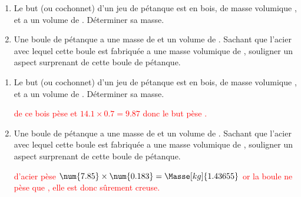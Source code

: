 \begin{exercice*}
    \begin{enumerate}
        \item Le but (ou cochonnet) d'un jeu de pétanque est en bois, de masse volumique , et a un volume de .
        Déterminer sa masse.
        \item Une boule de pétanque a une masse de  et un volume de .
        Sachant que l'acier avec lequel cette boule est fabriquée a une masse volumique de ,
        souligner un aspect surprenant de cette boule de pétanque.
    \end{enumerate}
\end{exercice*}
\begin{corrige}
    \begin{enumerate}
        \item Le but (ou cochonnet) d'un jeu de pétanque est en bois, de masse volumique , et a un volume de .
        Déterminer sa masse.
        \par\textcolor{red}{ de ce bois pèse et $\num{14.1}\times\num{0.7}=\num{9.87}$ donc le but pèse .}
        \item Une boule de pétanque a une masse de  et un volume de .
        Sachant que l'acier avec lequel cette boule est fabriquée a une masse volumique de ,
        souligner un aspect surprenant de cette boule de pétanque.
        \par\textcolor{red}{ d'acier pèse $\num{7.85}\times\num{0.183}=\Masse[kg]{1.43655}$ or la boule ne pèse que , elle
        est donc sûrement creuse.}
    \end{enumerate}
\end{corrige}

